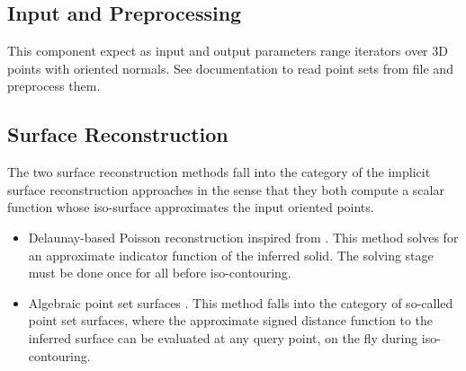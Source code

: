 \subsection{Input and Preprocessing}

This component expect as input and output parameters range iterators over 3D points with oriented normals.
See  documentation to read point sets from file and preprocess them.


\subsection{Surface Reconstruction}

The two surface reconstruction methods fall into the category of the implicit surface reconstruction approaches in the sense that they both compute a scalar function whose iso-surface approximates the input oriented points.
\begin{itemize}
\item Delaunay-based Poisson reconstruction inspired
      from \cite{Kazhdan06}. This method solves for
      an approximate indicator function of the inferred
      solid. The solving stage must be done once for all
      before iso-contouring. %
\item Algebraic point set surfaces \cite{Guennebaud07}.
      This method falls into the category of so-called
      point set surfaces, where the approximate
      signed distance function to the inferred surface
      can be evaluated at any query point, on the fly
      during iso-contouring.
\end{itemize}

  \\
  \\

